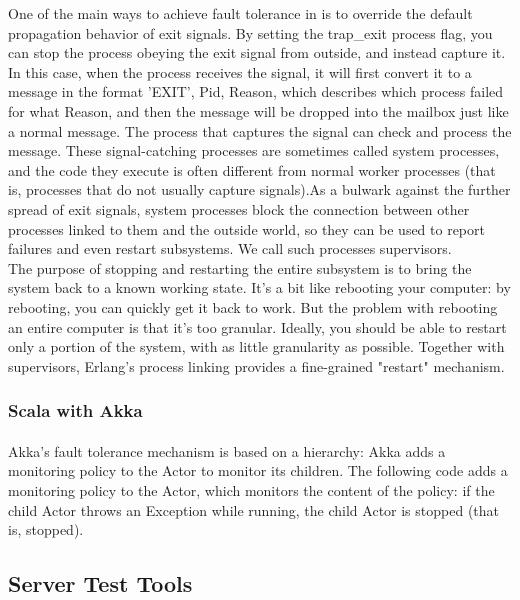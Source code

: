 \documentclass{article}
\begin{document}
One of the main ways to achieve fault tolerance in is to override the default propagation behavior of exit signals.  By setting the trap\_exit process flag, you can stop the process obeying the exit signal from outside, and instead capture it. In this case, when the process receives the signal, it will first convert it to a message in the format {'EXIT', Pid, Reason}, which describes which process failed for what Reason, and then the message will be dropped into the mailbox just like a normal message. The process that captures the signal can check and process the message. These signal-catching processes are sometimes called system processes, and the code they execute is often different from normal worker processes (that is, processes that do not usually capture signals).As a bulwark against the further spread of exit signals, system processes block the connection between other processes linked to them and the outside world, so they can be used to report failures and even restart subsystems. We call such processes supervisors.\\

The purpose of stopping and restarting the entire subsystem is to bring the system back to a known working state. It's a bit like rebooting your computer: by rebooting, you can quickly get it back to work. But the problem with rebooting an entire computer is that it's too granular. Ideally, you should be able to restart only a portion of the system, with as little granularity as possible. Together with supervisors, Erlang's process linking provides a fine-grained "restart" mechanism.\\

\subsubsection{Scala with Akka}\vspace{16pt}
\paragraph{}\vspace{11pt}\justifying
Akka's fault tolerance mechanism is based on a hierarchy: Akka adds a monitoring policy to the Actor to monitor its children. The following code adds a monitoring policy to the Actor, which monitors the content of the policy: if the child Actor throws an Exception while running, the child Actor is stopped (that is, stopped).\\

\subsection{Server Test Tools}\vspace{18pt}
\end{document}
